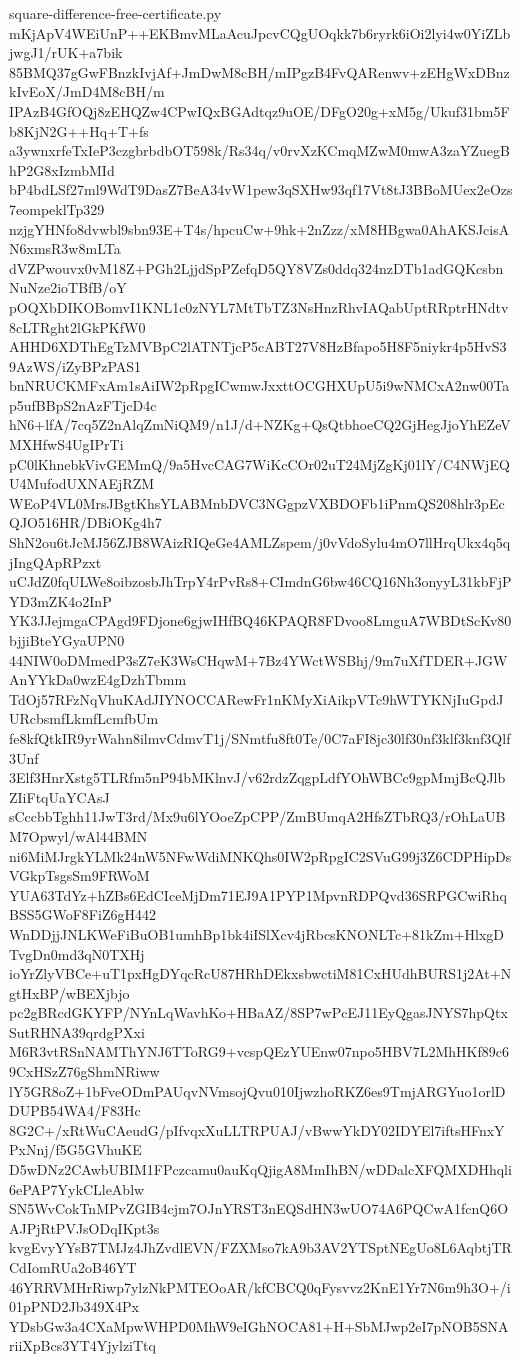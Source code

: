 \documentclass[11pt]{article}
\theoremstyle{definition}
\theoremstyle{remark}
\begin{document}
\begin{filecontents*}[overwrite]{square-difference-free-certificate.py}
mKjApV4WEiUnP++EKBmvMLaAcuJpcvCQgUOqkk7b6ryrk6iOi2lyi4w0YiZLbjwgJ1/rUK+a7bik
85BMQ37gGwFBnzkIvjAf+JmDwM8cBH/mIPgzB4FvQARenwv+zEHgWxDBnzkIvEoX/JmD4M8cBH/m
IPAzB4GfOQj8zEHQZw4CPwIQxBGAdtqz9uOE/DFgO20g+xM5g/Ukuf31bm5Fb8KjN2G++Hq+T+fs
a3ywnxrfeTxIeP3czgbrbdbOT598k/Rs34q/v0rvXzKCmqMZwM0mwA3zaYZuegBhP2G8xIzmbMId
bP4bdLSf27ml9WdT9DasZ7BeA34vW1pew3qSXHw93qf17Vt8tJ3BBoMUex2eOzs7eompeklTp329
nzjgYHNfo8dvwbl9sbn93E+T4s/hpcuCw+9hk+2nZzz/xM8HBgwa0AhAKSJcisAN6xmsR3w8mLTa
dVZPwouvx0vM18Z+PGh2LjjdSpPZefqD5QY8VZs0ddq324nzDTb1adGQKcsbnNuNze2ioTBfB/oY
pOQXbDIKOBomvI1KNL1c0zNYL7MtTbTZ3NsHnzRhvIAQabUptRRptrHNdtv8cLTRght2lGkPKfW0
AHHD6XDThEgTzMVBpC2lATNTjcP5cABT27V8HzBfapo5H8F5niykr4p5HvS39AzWS/iZyBPzPAS1
bnNRUCKMFxAm1sAiIW2pRpgICwmwJxxttOCGHXUpU5i9wNMCxA2nw00Tap5ufBBpS2nAzFTjcD4c
hN6+lfA/7cq5Z2nAlqZmNiQM9/n1J/d+NZKg+QsQtbhoeCQ2GjHegJjoYhEZeVMXHfwS4UgIPrTi
pC0lKhnebkVivGEMmQ/9a5HvcCAG7WiKcCOr02uT24MjZgKj01lY/C4NWjEQU4MufodUXNAEjRZM
WEoP4VL0MrsJBgtKhsYLABMnbDVC3NGgpzVXBDOFb1iPnmQS208hlr3pEcQJO516HR/DBiOKg4h7
ShN2ou6tJcMJ56ZJB8WAizRIQeGe4AMLZspem/j0vVdoSylu4mO7llHrqUkx4q5qjIngQApRPzxt
uCJdZ0fqULWe8oibzosbJhTrpY4rPvRs8+CImdnG6bw46CQ16Nh3onyyL31kbFjPYD3mZK4o2InP
YK3JJejmgaCPAgd9FDjone6gjwIHfBQ46KPAQR8FDvoo8LmguA7WBDtScKv80bjjiBteYGyaUPN0
44NIW0oDMmedP3sZ7eK3WsCHqwM+7Bz4YWctWSBhj/9m7uXfTDER+JGWAnYYkDa0wzE4gDzhTbmm
TdOj57RFzNqVhuKAdJIYNOCCARewFr1nKMyXiAikpVTc9hWTYKNjIuGpdJURcbsmfLkmfLcmfbUm
fe8kfQtkIR9yrWahn8ilmvCdmvT1j/SNmtfu8ft0Te/0C7aFI8jc30lf30nf3klf3knf3Qlf3Unf
3Elf3HnrXstg5TLRfm5nP94bMKlnvJ/v62rdzZqgpLdfYOhWBCc9gpMmjBcQJlbZIiFtqUaYCAsJ
sCccbbTghh11JwT3rd/Mx9u6lYOoeZpCPP/ZmBUmqA2HfsZTbRQ3/rOhLaUBM7Opwyl/wAl44BMN
ni6MiMJrgkYLMk24nW5NFwWdiMNKQhs0IW2pRpgIC2SVuG99j3Z6CDPHipDsVGkpTsgsSm9FRWoM
YUA63TdYz+hZBs6EdCIceMjDm71EJ9A1PYP1MpvnRDPQvd36SRPGCwiRhqBSS5GWoF8FiZ6gH442
WnDDjjJNLKWeFiBuOB1umhBp1bk4iISlXcv4jRbcsKNONLTc+81kZm+HlxgDTvgDn0md3qN0TXHj
ioYrZlyVBCe+uT1pxHgDYqcRcU87HRhDEkxsbwctiM81CxHUdhBURS1j2At+NgtHxBP/wBEXjbjo
pc2gBRcdGKYFP/NYnLqWavhKo+HBaAZ/8SP7wPcEJ11EyQgasJNYS7hpQtxSutRHNA39qrdgPXxi
M6R3vtRSnNAMThYNJ6TToRG9+vcspQEzYUEnw07npo5HBV7L2MhHKf89c69CxHSzZ76gShmNRiww
lY5GR8oZ+1bFveODmPAUqvNVmsojQvu010IjwzhoRKZ6es9TmjARGYuo1orlDDUPB54WA4/F83Hc
8G2C+/xRtWuCAeudG/pIfvqxXuLLTRPUAJ/vBwwYkDY02IDYEl7iftsHFnxYPxNnj/f5G5GVhuKE
D5wDNz2CAwbUBIM1FPczcamu0auKqQjigA8MmIhBN/wDDalcXFQMXDHhqli6ePAP7YykCLleAblw
SN5WvCokTnMPvZGIB4cjm7OJnYRST3nEQSdHN3wUO74A6PQCwA1fcnQ6OAJPjRtPVJsODqIKpt3s
kvgEvyYYsB7TMJz4JhZvdlEVN/FZXMso7kA9b3AV2YTSptNEgUo8L6AqbtjTRCdIomRUa2oB46YT
46YRRVMHrRiwp7ylzNkPMTEOoAR/kfCBCQ0qFysvvz2KnE1Yr7N6m9h3O+/i01pPND2Jb349X4Px
YDsbGw3a4CXaMpwWHPD0MhW9eIGhNOCA81+H+SbMJwp2eI7pNOB5SNAriiXpBcs3YT4YjylziTtq

\end{filecontents*}
\end{document}
